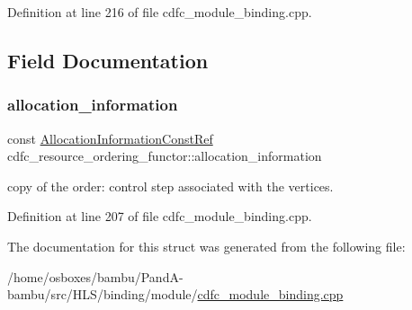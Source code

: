 Definition at line 216 of file cdfc\+\_\+module\+\_\+binding.\+cpp.



\subsection{Field Documentation}
\mbox{\label{structcdfc__resource__ordering__functor_a5249d5b44b4c250637ff156eccc7fb45}} 
\subsubsection{\texorpdfstring{allocation\+\_\+information}{allocation\_information}}
{\footnotesize\ttfamily const \hyperlink{allocation__information_8hpp_a54287618a63bf87e31ddb17ba01e7ca7}{Allocation\+Information\+Const\+Ref} cdfc\+\_\+resource\+\_\+ordering\+\_\+functor\+::allocation\+\_\+information\hspace{0.3cm}{\ttfamily [private]}}



copy of the order\+: control step associated with the vertices. 



Definition at line 207 of file cdfc\+\_\+module\+\_\+binding.\+cpp.



The documentation for this struct was generated from the following file\+:\begin{DoxyCompactItemize}
\item 
/home/osboxes/bambu/\+Pand\+A-\/bambu/src/\+H\+L\+S/binding/module/\hyperlink{cdfc__module__binding_8cpp}{cdfc\+\_\+module\+\_\+binding.\+cpp}\end{DoxyCompactItemize}
